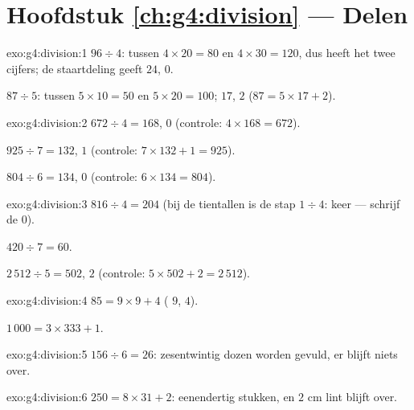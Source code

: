 \section*{Hoofdstuk \ref{ch:g4:division} --- Delen}

\begin{solution}{exo:g4:division:1}
$96 \div 4$: tussen $4 \times 20 = 80$ en $4 \times 30 = 120$, dus heeft
het  twee cijfers; de staartdeling geeft $24$,  $0$.

$87 \div 5$: tussen $5 \times 10 = 50$ en $5 \times 20 = 100$; 
$17$,  $2$ ($87 = 5 \times 17 + 2$).
\end{solution}

\begin{solution}{exo:g4:division:2}
$672 \div 4 = 168$,  $0$ (controle: $4 \times 168 = 672$).

$925 \div 7 = 132$,  $1$ (controle: $7 \times 132 + 1 = 925$).

$804 \div 6 = 134$,  $0$ (controle: $6 \times 134 = 804$).
\end{solution}

\begin{solution}{exo:g4:division:3}
$816 \div 4 = 204$ (bij de tientallen is de stap $1 \div 4$:  keer ---
schrijf de $0$).

$420 \div 7 = 60$.

$2\,512 \div 5 = 502$,  $2$ (controle: $5 \times 502 + 2 = 2\,512$).
\end{solution}

\begin{solution}{exo:g4:division:4}
$85 = 9 \times 9 + 4$ ( $9$,  $4$).

$1\,000 = 3 \times 333 + 1$.
\end{solution}

\begin{solution}{exo:g4:division:5}
$156 \div 6 = 26$: zesentwintig dozen worden gevuld, er blijft niets over.
\end{solution}

\begin{solution}{exo:g4:division:6}
$250 = 8 \times 31 + 2$: eenendertig stukken, en $2$ cm lint blijft over.
\end{solution}

